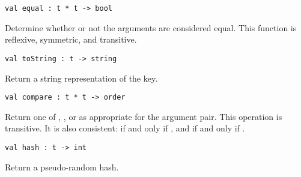 \begin{gram}[equal]
\begin{verbatim}
val equal : t * t -> bool
\end{verbatim}
Determine whether or not the arguments are considered equal. This function is
reflexive, symmetric, and transitive.
\end{gram}

\begin{gram}[toString]
\begin{verbatim}
val toString : t -> string
\end{verbatim}
Return a string representation of the key.
\end{gram}

\begin{gram}[compare]
\begin{verbatim}
val compare : t * t -> order
\end{verbatim}
Return one of , , or  as appropriate for
the argument pair. This operation is transitive. It is also consistent:
 if and only if , and
 if and only if .
\end{gram}

\begin{gram}[hash]
\begin{verbatim}
val hash : t -> int
\end{verbatim}
Return a pseudo-random hash.
\end{gram}


